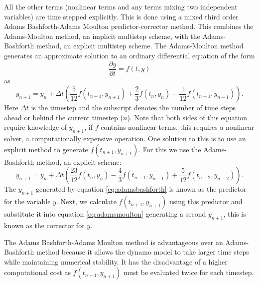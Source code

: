 All the other terms (nonlinear terms and any terms mixing two independent variables) are time stepped explicitly. This is done using a mixed third order Adams Bashforth-Adams Moulton predictor-corrector method. This combines the Adams-Moulton method, an implicit multistep scheme, with the Adams-Bashforth method, an explicit multistep scheme. The Adams-Moulton method generates an approximate solution to an ordinary differential equation of the form
\begin{equation}
\frac{\partial y}{\partial t}=f\left(t, y\right)
\end{equation}
as 
\begin{equation}
\label{eq:adamsmoulton}
y_{n+1} = y_{n} + \Delta t \left( \frac{5}{12} f(t_{n+1},y_{n+1}) + \frac{2}{3} f(t_{n},y_{n}) - \frac{1}{12} f(t_{n-1},y_{n-1}) \right).
\end{equation}
Here $\Delta t$ is the timestep and the subscript denotes the number of time steps ahead or behind the current timestep ($n$). Note that both sides of this equation require knowledge of $y_{n+1}$, if $f$ contains nonlinear terms, this requires a nonlinear solver, a computationally expensive operation.  One solution to this is to use an explicit method to generate $f\left(t_{n+1}, y_{n+1}\right)$. For this we use the Adams-Bashforth method, an explicit scheme:
\begin{equation}
\label{eq:adamsbashforth}
y_{n+1}  = y_{n} + \Delta t\left( \frac{23}{12} f(t_{n}, y_{n}) - \frac43 f(t_{n-1}, y_{n-1}) + \frac{5}{12}f(t_{n-2}, y_{n-2})\right).
\end{equation}
The $y_{n+1}$ generated by equation \ref{eq:adamsbashforth} is known as the predictor for the variable $y$. Next, we calculate $f(t_{n+1},y_{n+1})$ using this predictor and substitute it into equation \ref{eq:adamsmoulton} generating a second $y_{n+1}$, this is known as the corrector for $y$.

The Adams Bashforth-Adams Moulton method is advantageous over an Adams-Bashforth method because it allows the dynamo model to take larger time steps while maintaining numerical stability. It has the disadvantage of a higher computational cost as $f(t_{n+1},y_{n+1})$ must be evaluated twice for each timestep. 

